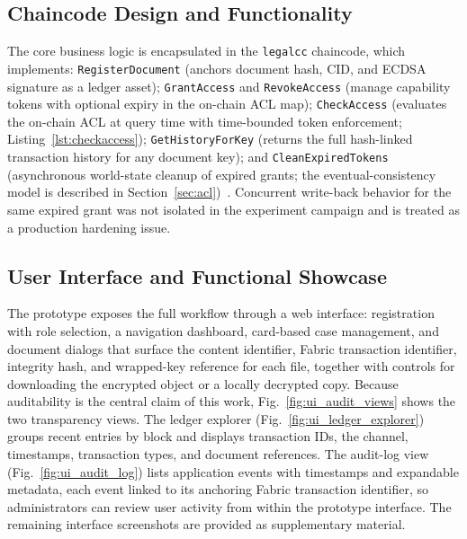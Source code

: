 \documentclass[preprint,12pt]{elsarticle}
\begin{document}
\subsection{Chaincode Design and Functionality}
\label{sec:chaincode}

The core business logic is encapsulated in the \texttt{legalcc}
chaincode, which implements: \texttt{RegisterDocument} (anchors
document hash, CID, and ECDSA signature as a ledger asset);
\texttt{GrantAccess} and \texttt{RevokeAccess} (manage capability
tokens with optional expiry in the on-chain ACL map);
\texttt{CheckAccess} (evaluates the on-chain ACL at query time with
time-bounded token enforcement; Listing~\ref{lst:checkaccess});
\texttt{GetHistoryForKey} (returns the full hash-linked transaction
history for any document key); and \texttt{CleanExpiredTokens}
(asynchronous world-state cleanup of expired grants; the
eventual-consistency model is described in
Section~\ref{sec:acl})~\cite{fabricChaincodeStubDoc}. Concurrent
write-back behavior for the same expired grant was not isolated in
the experiment campaign and is treated as a production hardening
issue.

\subsection{User Interface and Functional Showcase}
\label{sec:ui}

The prototype exposes the full workflow through a web interface:
registration with role selection, a navigation dashboard, card-based case
management, and document dialogs that surface the content identifier,
Fabric transaction identifier, integrity hash, and wrapped-key reference
for each file, together with controls for downloading the encrypted
object or a locally decrypted copy. Because auditability is the central
claim of this work, Fig.~\ref{fig:ui_audit_views} shows the two
transparency views. The ledger explorer (Fig.~\ref{fig:ui_ledger_explorer})
groups recent entries by block and displays transaction IDs, the channel,
timestamps, transaction types, and document references. The audit-log view
(Fig.~\ref{fig:ui_audit_log}) lists application events with timestamps and
expandable metadata, each event linked to its anchoring Fabric transaction
identifier, so administrators can review user activity from within
the prototype interface. The remaining interface screenshots are provided
as supplementary material.
\end{document}
